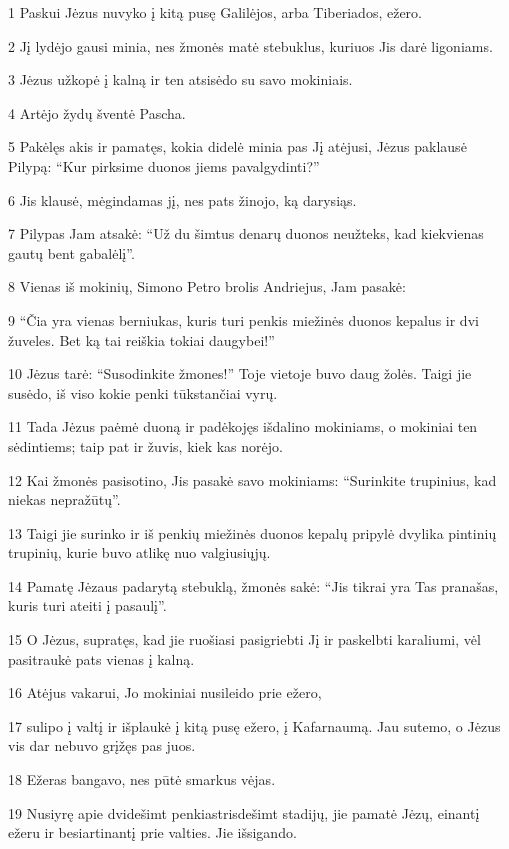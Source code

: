 \par 1 Paskui Jėzus nuvyko į kitą pusę Galilėjos, arba Tiberiados, ežero. 
\par 2 Jį lydėjo gausi minia, nes žmonės matė stebuklus, kuriuos Jis darė ligoniams. 
\par 3 Jėzus užkopė į kalną ir ten atsisėdo su savo mokiniais. 
\par 4 Artėjo žydų šventė Pascha. 
\par 5 Pakėlęs akis ir pamatęs, kokia didelė minia pas Jį atėjusi, Jėzus paklausė Pilypą: “Kur pirksime duonos jiems pavalgydinti?” 
\par 6 Jis klausė, mėgindamas jį, nes pats žinojo, ką darysiąs. 
\par 7 Pilypas Jam atsakė: “Už du šimtus denarų duonos neužteks, kad kiekvienas gautų bent gabalėlį”. 
\par 8 Vienas iš mokinių, Simono Petro brolis Andriejus, Jam pasakė: 
\par 9 “Čia yra vienas berniukas, kuris turi penkis miežinės duonos kepalus ir dvi žuveles. Bet ką tai reiškia tokiai daugybei!” 
\par 10 Jėzus tarė: “Susodinkite žmones!” Toje vietoje buvo daug žolės. Taigi jie susėdo, iš viso kokie penki tūkstančiai vyrų. 
\par 11 Tada Jėzus paėmė duoną ir padėkojęs išdalino mokiniams, o mokiniai ten sėdintiems; taip pat ir žuvis, kiek kas norėjo. 
\par 12 Kai žmonės pasisotino, Jis pasakė savo mokiniams: “Surinkite trupinius, kad niekas nepražūtų”. 
\par 13 Taigi jie surinko ir iš penkių miežinės duonos kepalų pripylė dvylika pintinių trupinių, kurie buvo atlikę nuo valgiusiųjų. 
\par 14 Pamatę Jėzaus padarytą stebuklą, žmonės sakė: “Jis tikrai yra Tas pranašas, kuris turi ateiti į pasaulį”. 
\par 15 O Jėzus, supratęs, kad jie ruošiasi pasigriebti Jį ir paskelbti karaliumi, vėl pasitraukė pats vienas į kalną. 
\par 16 Atėjus vakarui, Jo mokiniai nusileido prie ežero, 
\par 17 sulipo į valtį ir išplaukė į kitą pusę ežero, į Kafarnaumą. Jau sutemo, o Jėzus vis dar nebuvo grįžęs pas juos. 
\par 18 Ežeras bangavo, nes pūtė smarkus vėjas. 
\par 19 Nusiyrę apie dvidešimt penkias­trisdešimt stadijų, jie pamatė Jėzų, einantį ežeru ir besiartinantį prie valties. Jie išsigando. 
